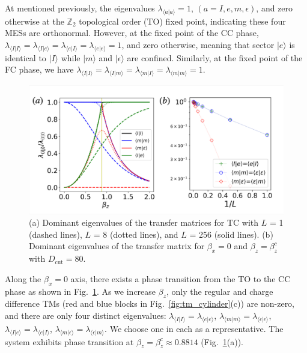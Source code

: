 \documentclass{ntuthesis}
\begin{document}
At mentioned previously, the eigenvalues $ \lambda_{\langle a | a \rangle} =1 $, $( a =I,e,m, \epsilon )$, and zero otherwise at the $\mathbb{ Z}_2 $ topological order (TO) fixed point, indicating these four MESs are orthonormal. 
%
However, at the fixed point of the CC phase, $\lambda_{\langle I|I\rangle} = \lambda_{\langle I| e \rangle} = \lambda_{\langle  e| I \rangle} = \lambda_{\langle e | e \rangle}  = 1 $, and zero otherwise, meaning that sector $|e\rangle$ is identical to $|I\rangle$ while $|m\rangle$ and $|\epsilon\rangle$ are confined.  
%
Similarly, at the fixed point of the FC phase, we have $\lambda_{\langle I |I\rangle} = \lambda_{\langle I| m \rangle} = \lambda_{\langle   m | I \rangle} = \lambda_{\langle m | m \rangle}  = 1$. 



\begin{figure}[t]
\centering
\includegraphics[width=\linewidth]{HOTRG_TC}
\caption{(a) Dominant eigenvalues  of the transfer matrices for TC with $L$ = 1 (dashed lines), $L$ = 8 (dotted lines), and $L$ = 256 (solid lines).
(b)  Dominant eigenvalues of  the  transfer matrix  for $\beta_x=0$ and $\beta_z = \beta_{z}^c$  with $D_\text{cut}=80$.
} 
\label{fig:HOTRG_TC}
\end{figure}



Along the $\beta_x=0$ axis, there exists a  phase transition from  the TO  to the CC phase as shown in Fig.~\ref{fig:HOTRG_TC}. 
%
As we increase $\beta_z$, only the regular and charge difference TMs  (red and blue blocks in Fig.~\ref{fig:tm_cylinder}(c)) are non-zero, and %
there are only four distinct eigenvalues: $\lambda_{\langle I| I\rangle} = \lambda_{\langle e|e \rangle}$, $\lambda_{\langle m| m\rangle} = \lambda_{\langle \epsilon | \epsilon \rangle}$, $\lambda_{\langle I| e\rangle} =\lambda_{ \langle e| I\rangle}$,  $\lambda_{\langle m| \epsilon\rangle} =\lambda_{ \langle \epsilon| m\rangle}$.
%
We choose one in each  as a representative.
% 
The system exhibits phase transition at $\beta_z = \beta_z^c \approx 0.8814$ (Fig.~\ref{fig:HOTRG_TC}(a)).
\end{document}
